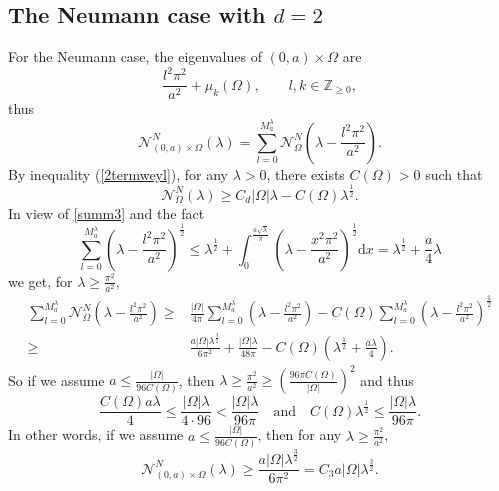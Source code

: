 \documentclass[11pt,letterpaper]{amsart}
\numberwithin{equation}{section}
\theoremstyle{plain}
\theoremstyle{plain}
\numberwithin{equation}{section}
\theoremstyle{remark}
\begin{document}
	\subsection{The Neumann case with $d=2$}\label{Neud=2}
	For the Neumann case, the eigenvalues of $(0,a)\times \Omega$ are 
	\begin{equation*}\label{Neu}
		\frac{l^2 \pi^2}{a^2}+ \mu_k(\Omega), \qquad l,k\in \mathbb{Z}_{\ge 0},
	\end{equation*}
	thus
	\begin{equation} \label{8}
		\mathcal{N}^N_{(0,a)\times \Omega}(\lambda)=\sum_{l=0}^{M_a^\lambda}\mathcal{N}^N_\Omega(\lambda-\frac{l^2\pi^2}{a^2}).
	\end{equation} 
	By inequality (\ref{2termweyl}), for any $\lambda>0$, there exists  $C(\Omega)>0$ such that 
	\[
	\mathcal{N}^N_\Omega(\lambda)\ge C_d|\Omega|\lambda- C(\Omega)\lambda^{\frac{1}{2}}.
	\]
	In view of \eqref{summ3} and the fact 
	\[
	\sum_{l=0}^{M_a^\lambda} (\lambda-\frac{l^2\pi^2}{a^2})^{\frac{1}{2}} \le  \lambda^{\frac 12}+\int_0^{\frac{a\sqrt{\lambda}}{\pi}} (\lambda- \frac{x^2\pi^2}{a^2})^{\frac{1}{2}} \mathrm{d}x =\lambda^{\frac 12}+\frac{a}{4}\lambda
	\]
	we get, for $\lambda \ge \frac{\pi^2}{a^2}$, 
	\begin{equation*} 
		\begin{aligned}
			\sum_{l=0}^{M_a^\lambda} \mathcal{N}^N_\Omega(\lambda-\frac{l^2\pi^2}{a^2})  
			\ge& \frac{|\Omega|}{4\pi}\sum_{l=0}^{M_a^\lambda} (\lambda-\frac{l^2\pi^2}{a^2})-C(\Omega)\sum_{l=0}^{M_a^\lambda} (\lambda-\frac{l^2\pi^2}{a^2})^{\frac{1}{2}}\\
			\ge&   \frac{a|\Omega|\lambda^{\frac{3}{2}}}{6\pi^2}+\frac{|\Omega|\lambda}{48\pi}-C(\Omega)(\lambda^{\frac{1}{2}}+\frac{a \lambda}{4}).
		\end{aligned}
	\end{equation*}  
	So if we assume $a\le \frac{|\Omega|}{96 C(\Omega)}$, then  $\lambda\ge \frac{\pi^2}{a^2} \ge (\frac{96\pi C(\Omega)}{|\Omega|})^2$ and thus 
	\[
	\frac{C(\Omega)a\lambda}{4}\le \frac{|\Omega|\lambda}{4\cdot 96} <\frac{|\Omega|\lambda}{96\pi} \quad \text{and} \quad C(\Omega)\lambda^{\frac{1}{2}}\le \frac{|\Omega|\lambda}{96\pi}.
	\] 
	In other words, if we assume $a\le \frac{|\Omega|}{96 C(\Omega)}$, then for any $\lambda\ge \frac{\pi^2}{a^2}$, 
	\[
	\mathcal{N}^N_{(0,a)\times\Omega}(\lambda)\ge \frac{a |\Omega|\lambda^{\frac{3}{2}}}{6\pi^2}=C_3 a |\Omega|\lambda^{\frac{3}{2}}.
	\]
	
\end{document}
